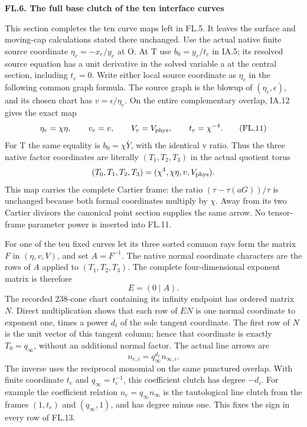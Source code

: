 \par

\medskip\noindent\textbf{FL.6. The full base clutch of the ten interface curves}

\par\nobreak

This section completes the ten curve maps left in FL.5. It leaves
the surface and moving-cap calculations stated there unchanged.
Use the actual native finite source coordinate \(\eta_e=-x_e/y_e\)
at O. At T use \(b_0=y_e/t_e\) in IA.5; its resolved source
equation has a unit derivative in the solved variable a
at the central section, including \(t_e=0\). Write either local
source coordinate as \(\eta_e\) in the following common graph
formula. The source graph is the blowup of
\((\eta_e,\epsilon)\), and its chosen chart has
\(v=\epsilon/\eta_e\). On the entire complementary overlap,
IA.12 gives the exact map
\[
 \eta_e=\chi\eta,\qquad v_e=v,\qquad
 V_e=V_{\rm phys},\qquad t_e=\chi^{-4}.
 \tag{FL.11}
\]
For T the same equality is \(b_0=\chi\bar Y\), with the
identical v ratio. Thus the three native factor coordinates
are literally \((T_1,T_2,T_3)\) in the actual quotient torus
\[
 (T_0,T_1,T_2,T_3)=(\chi^4,\chi\eta,v,V_{\rm phys}).
\]
This map carries the complete Cartier frame: the ratio
\((\tau-\tau(aG))/\tau\) is unchanged because both formal
coordinates multiply by \(\chi\). Away from its two Cartier
divisors the canonical point section supplies the same arrow.
No tensor-frame parameter power is inserted into FL.11.

For one of the ten fixed curves let its three sorted common
rays form the matrix \(F\) in \((\eta,v,V)\), and set
\(A=F^{-1}\). The native normal coordinate characters are
the rows of \(A\) applied to \((T_1,T_2,T_3)\). The complete
four-dimensional exponent matrix is therefore
\[
 E=(0\mid A).
 \tag{FL.12}
\]
The recorded 238-cone chart containing its infinity endpoint
has ordered matrix \(N\). Direct multiplication shows that
each row of \(EN\) is one normal coordinate to exponent one,
times a power \(d_i\) of the sole tangent coordinate. The
first row of \(N\) is the unit vector of this tangent column;
hence that coordinate is exactly \(T_0=q_\infty\), without
an additional normal factor. The actual line arrows are
\[
 n_{e,i}=q_\infty^{d_i}n_{\infty,i}.
 \tag{FL.13}
\]
The inverse uses the reciprocal monomial on the same punctured
overlap. With finite coordinate \(t_e\) and
\(q_\infty=t_e^{-1}\), this coefficient clutch has degree
\(-d_i\). For example the coefficient relation
\(n_e=q_\infty n_\infty\) is the tautological line clutch
from the frames \((1,t_e)\) and \((q_\infty,1)\), and has
degree minus one. This fixes the sign in every row of FL.13.

